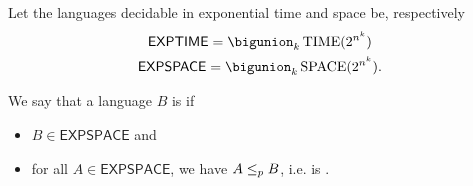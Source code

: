 \documentclass{standalone}
\begin{document}
\begin{definition}
	Let the languages decidable in exponential time and space be, respectively
	\begin{gather*}
		\mathsf{EXPTIME} = \bigunion_k \TIME(2^{n^k}) \\
		\mathsf{EXPSPACE} = \bigunion_k \SPACE(2^{n^k}).
	\end{gather*}
\end{definition}

\begin{definition}
	We say that a language \(B\) is  if
	\begin{itemize}
		\item \(B \in \mathsf{EXPSPACE}\) and
		\item for all \(A \in \mathsf{EXPSPACE}\), we have \(A \mathrel{\leq_p} B\), i.e. is .
	\end{itemize}
\end{definition}
\end{document}
